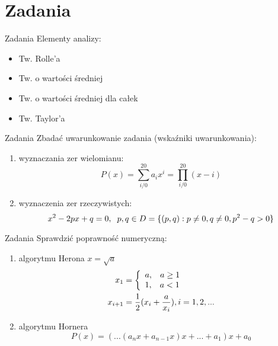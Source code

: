 \section{Zadania}
\begin{frame}{Zadania}
	Elementy analizy:
    \begin{itemize}
    	\item Tw. Rolle'a
        \item Tw. o wartości średniej
        \item Tw. o wartości średniej dla całek
        \item Tw. Taylor'a
    \end{itemize}
\end{frame}
\begin{frame}{Zadania}
	Zbadać uwarunkowanie zadania (wskaźniki uwarunkowania):
    \begin{enumerate}
    	\item wyznaczania zer wielomianu: \[
				P(x) = \sum_{i/0}^{20} a_i x^i = \prod_{i/0}^{20} (x-i)
            \]
        \item wyznaczenia zer rzeczywistych: \[
        		x^2 - 2px + q = 0, \hspace{.2cm} p, q \in D = \{ 
                	(p, q): p \neq 0, q \neq 0, p^2 - q > 0
                \}
        	\]
    \end{enumerate}
\end{frame}
\begin{frame}{Zadania}
	Sprawdzić poprawność numeryczną:
    \begin{enumerate}
    	\item algorytmu Herona $x = \sqrt{a}$
        	\begin{align*}
                x_1 &= \left\{
                    \begin{array}{ll}
                        a, \hspace{.3cm} a \ge 1 \\
                        1, \hspace{.3cm} a < 1
                    \end{array}
                \right. \\ 
                x_{i+1} &= \frac{1}{2}(x_i + \frac{a}{x_i}), i=1, 2, ...
        	\end{align*}
        \item algorytmu Hornera \[
        	P(x) = (...(a_n x + a_{n-1} x)x + ... + a_1) x + a_0
        \]
    \end{enumerate}
\end{frame}